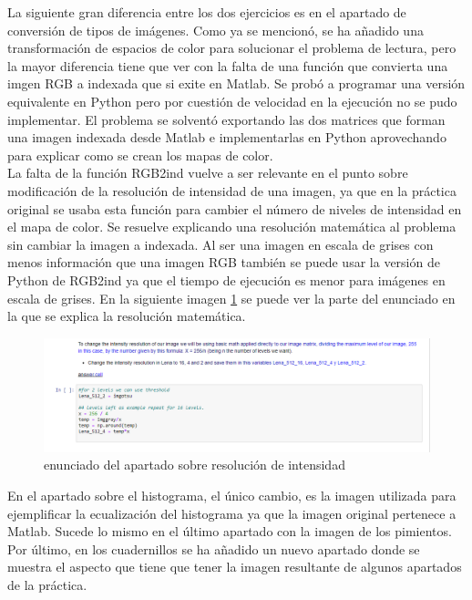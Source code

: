 \documentclass[a4paper,12pt]{report}
\begin{document}
La siguiente gran diferencia entre los dos ejercicios es en el apartado de conversión de tipos de imágenes. Como ya se mencionó, se ha añadido una transformación de espacios de color para solucionar el problema de lectura, pero la mayor diferencia tiene que ver con la falta de una función que convierta una imgen RGB a indexada que si exite en Matlab. Se probó a programar una versión equivalente en Python pero por cuestión de velocidad en la ejecución no se pudo implementar. El problema se solventó exportando las dos matrices que forman una imagen indexada desde Matlab  e implementarlas en Python aprovechando para explicar como se crean los mapas de color.\\

La falta de la función RGB2ind vuelve a ser relevante en el punto sobre modificación de la resolución de intensidad de una imagen, ya que en la práctica original se usaba esta función para cambier el número de niveles de intensidad en el mapa de color. Se resuelve explicando una resolución matemática al problema sin cambiar la imagen a indexada. Al ser una imagen en escala de grises con menos información que una imagen RGB también se puede usar la versión de Python de RGB2ind ya que el tiempo de ejecución es menor para imágenes en escala de grises. En la siguiente imagen \ref{resmatematica} se puede ver la parte del enunciado en la que se explica la resolución matemática. 

\begin{figure}[h]
\centering
\includegraphics[width=1\textwidth]{imagenes/resolucionmatematica}
\caption{enunciado del apartado sobre resolución de intensidad}
\label{resmatematica}
\end{figure}

En el apartado sobre el histograma, el único cambio, es la imagen utilizada para ejemplificar la ecualización del histograma ya que la imagen original pertenece a Matlab. Sucede lo mismo en el último apartado con la imagen de los pimientos.\\

Por último, en los cuadernillos se ha añadido un nuevo apartado donde se muestra el aspecto que tiene que tener la imagen resultante de algunos apartados de la práctica.
\end{document}
